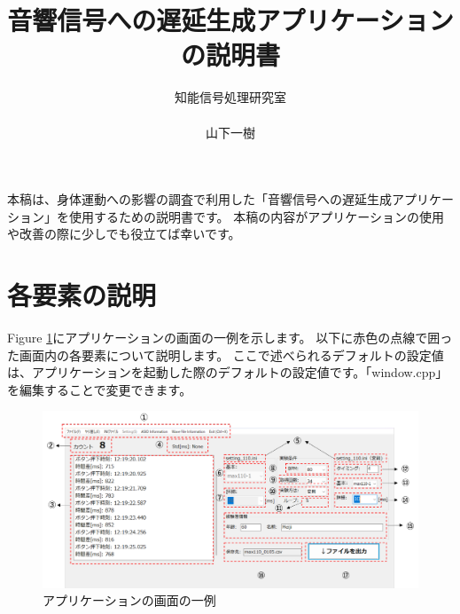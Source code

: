 \documentclass{article} %
\title{音響信号への遅延生成アプリケーションの説明書} %
\author{知能信号処理研究室\\\\山下一樹} %
\begin{document}

\maketitle %
本稿は、身体運動への影響の調査で利用した「音響信号への遅延生成アプリケーション」を使用するための説明書です。
本稿の内容がアプリケーションの使用や改善の際に少しでも役立てば幸いです。
\section{各要素の説明} 
Figure \ref{fig:app_kyakkann}にアプリケーションの画面の一例を示します。
以下に赤色の点線で囲った画面内の各要素について説明します。
ここで述べられるデフォルトの設定値は、アプリケーションを起動した際のデフォルトの設定値です。「window.cpp」を編集することで変更できます。
\begin{figure}[tbp]
  \centering
  \includegraphics[scale=0.5]{figures_app_1.pdf}
  \caption{アプリケーションの画面の一例}
  \label{fig:app_kyakkann}
\end{figure}
\end{document}
